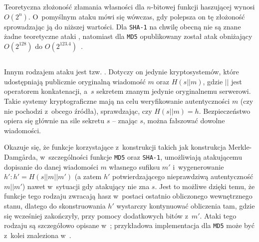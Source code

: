 Teoretyczna złożoność złamania własności  dla
$n$-bitowej funkcji haszującej wynosi $O(2^n)$. O~pomyślnym ataku mówi się
wówczas, gdy polepsza on tę złożoność sprowadzając ją do niższej wartości. Dla
\texttt{SHA-1} na chwilę obecną nie są znane żadne teoretyczne ataki
, natomiast dla \texttt{MD5} opublikowany został atak obniżający
$O(2^{128})$ do $O(2^{123.4})$~\cite{best_md5_preimage_attack}.



\subsection{}
Innym rodzajem ataku jest tzw. . Dotyczy on jedynie
kryptosystemów, które udostępniają publicznie oryginalną wiadomość $m$ oraz
$H(s || m)$, gdzie $||$ jest operatorem konkatenacji, a~$s$ sekretem znanym
jedynie oryginalnemu serwerowi. Takie systemy kryptograficzne mają na celu
weryfikowanie autentyczności $m$ (czy nie pochodzi z~obcego źródła),
sprawdzając, czy $H(s||m)=h$. Bezpieczeństwo opiera się głównie na sile sekretu
$s$ -- znając $s$, można fałszować dowolne wiadomości.

Okazuje się, że funkcje korzystające z~konstrukcji takich jak konstrukcja
Merkle-Damg\r{a}rda, w~szczególności funkcje \texttt{MD5} oraz \texttt{SHA-1},
umożliwiają atakującemu dopisanie do danej wiadomości $m$ własnego sufiksu $m'$
i~wygenerowanie $h' : h' = H(s || m || m')$ (a zatem $h'$ potwierdzającego
nieprawdziwą autentyczność $m||m'$) nawet w~sytuacji gdy atakujący nie zna $s$.
Jest to możliwe dzięki temu, że funkcje tego rodzaju zwracają hasz w~postaci
ostatnio obliczonego wewnętrznego stanu, dlatego do skonstruowania $h'$
wystarczy kontynuować obliczenia tam, gdzie się wcześniej zakończyły, przy
pomocy dodatkowych bitów z~$m'$. Ataki tego rodzaju są szczegółowo opisane
w~\cite{md5_length_extension_attack}; przykładowa implementacja dla
\texttt{MD5} może być z~kolei znaleziona
w~\cite{md5_length_extension_attack_implementation}.
